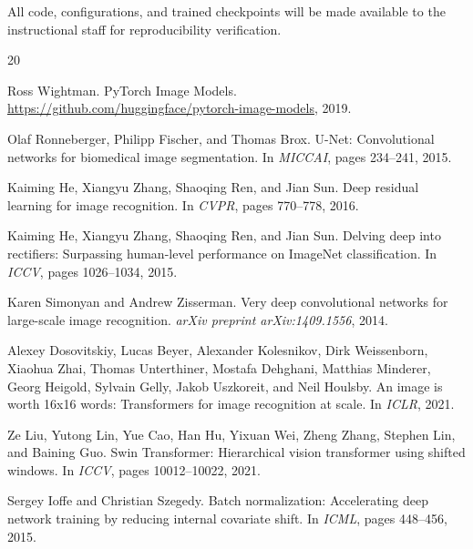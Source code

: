 \documentclass{article}
\begin{document}
All code, configurations, and trained checkpoints will be made available to the instructional staff for reproducibility verification.

{\small

\begin{thebibliography}{20}

Ross Wightman.
\newblock PyTorch Image Models.
\newblock \url{https://github.com/huggingface/pytorch-image-models}, 2019.

Olaf Ronneberger, Philipp Fischer, and Thomas Brox.
\newblock U-Net: Convolutional networks for biomedical image segmentation.
\newblock In \emph{MICCAI}, pages 234--241, 2015.

Kaiming He, Xiangyu Zhang, Shaoqing Ren, and Jian Sun.
\newblock Deep residual learning for image recognition.
\newblock In \emph{CVPR}, pages 770--778, 2016.

Kaiming He, Xiangyu Zhang, Shaoqing Ren, and Jian Sun.
\newblock Delving deep into rectifiers: Surpassing human-level performance on ImageNet classification.
\newblock In \emph{ICCV}, pages 1026--1034, 2015.

Karen Simonyan and Andrew Zisserman.
\newblock Very deep convolutional networks for large-scale image recognition.
\newblock \emph{arXiv preprint arXiv:1409.1556}, 2014.

Alexey Dosovitskiy, Lucas Beyer, Alexander Kolesnikov, Dirk Weissenborn, Xiaohua Zhai, Thomas Unterthiner, Mostafa Dehghani, Matthias Minderer, Georg Heigold, Sylvain Gelly, Jakob Uszkoreit, and Neil Houlsby.
\newblock An image is worth 16x16 words: Transformers for image recognition at scale.
\newblock In \emph{ICLR}, 2021.

Ze Liu, Yutong Lin, Yue Cao, Han Hu, Yixuan Wei, Zheng Zhang, Stephen Lin, and Baining Guo.
\newblock Swin Transformer: Hierarchical vision transformer using shifted windows.
\newblock In \emph{ICCV}, pages 10012--10022, 2021.

Sergey Ioffe and Christian Szegedy.
\newblock Batch normalization: Accelerating deep network training by reducing internal covariate shift.
\newblock In \emph{ICML}, pages 448--456, 2015.


\end{thebibliography}}
\end{document}
